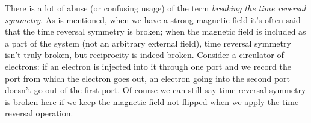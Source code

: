 \documentclass[hyperref, a4paper]{article}
\newcommand*{\term}[1]{\textit{#1}}
\begin{document}
There is a lot of abuse (or confusing usage) of the term \term{breaking the time reversal symmetry}.
As is mentioned, when we have a strong magnetic field 
it's often said that the time reversal symmetry is broken; 
when the magnetic field is included as a part of the system 
(not an arbitrary external field), 
time reversal symmetry isn't truly broken, 
but reciprocity is indeed broken.
Consider a circulator of electrons: 
if an electron is injected into it through one port 
and we record the port from which the electron goes out, 
an electron going into the second port doesn't go out of the first port.
Of course we can still say time reversal symmetry is broken here 
if we keep the magnetic field not flipped when we apply the time reversal operation. 
\end{document}
